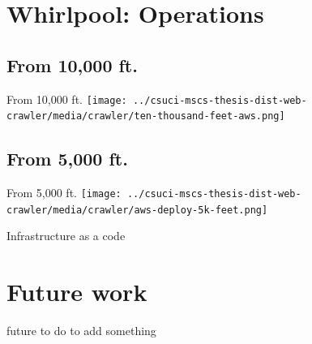 \documentclass[9pt]{beamer}
\begin{document}

\section[opswork]{Whirlpool: Operations}
\begin{frame}[plain]
\end{frame}


\subsection{From 10,000 ft.}
\begin{frame}{From 10,000 ft.}
 \centering
 \texttt{[image: ../csuci-mscs-thesis-dist-web-crawler/media/crawler/ten-thousand-feet-aws.png]} 
\end{frame}


\subsection{From 5,000 ft.}
\begin{frame}{From 5,000 ft.}
  \centering
  \texttt{[image: ../csuci-mscs-thesis-dist-web-crawler/media/crawler/aws-deploy-5k-feet.png]}
\end{frame}


\begin{frame}{Infrastructure as a code}
  \centering
\end{frame}


\section[Future]{Future work}
\begin{frame}[plain]
\end{frame}


\begin{frame}{future to do}
  to add something
\end{frame}


%  


\begin{frame}[plain]
\end{frame}
\end{document}
